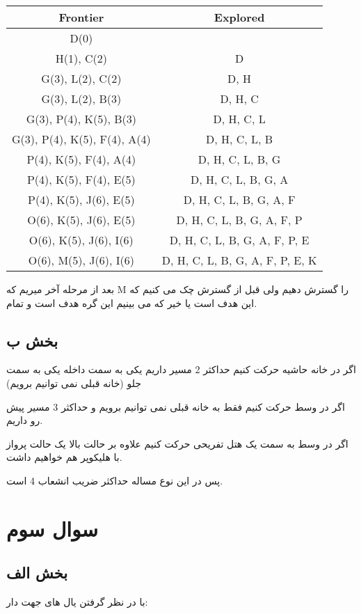 \documentclass[paper=a4, fontsize=11pt]{article}
\begin{document}
\begin{center}
\begin{latin}
\begin{tabular}{ |c|c| } 
\hline
Frontier & Explored \\
\hline
D(0) &   \\ 
H(1), C(2) & D \\ 
G(3), L(2), C(2) & D, H \\ 
G(3), L(2), B(3) & D, H, C \\ 
G(3), P(4), K(5), B(3) & D, H, C, L \\ 
G(3), P(4), K(5), F(4), A(4) & D, H, C, L, B \\ 
P(4), K(5), F(4), A(4) & D, H, C, L, B, G \\ 
P(4), K(5), F(4), E(5) & D, H, C, L, B, G, A \\ 
P(4), K(5), J(6), E(5) & D, H, C, L, B, G, A, F\\ 
O(6), K(5), J(6), E(5) & D, H, C, L, B, G, A, F, P\\ 
O(6), K(5), J(6), I(6) & D, H, C, L, B, G, A, F, P, E\\ 
O(6), M(5), J(6), I(6) & D, H, C, L, B, G, A, F, P, E, K\\ 
\hline
\end{tabular}
\end{latin}
\end{center}

بعد از مرحله آخر میریم که M را گسترش دهیم ولی قبل از گسترش چک می کنیم که این هدف است یا خیر که می بینیم این گره هدف است و تمام.


\subsection{بخش ب}
اگر در خانه حاشیه حرکت کنیم حداکثر 2 مسیر داریم یکی به سمت داخله یکی به سمت جلو (خانه قبلی نمی توانیم برویم)

اگر در وسط حرکت کنیم فقط به خانه قبلی نمی توانیم برویم و حداکثر 3 مسیر پیش رو داریم.

اگر در وسط به سمت یک هتل تفریحی حرکت کنیم علاوه بر حالت بالا یک حالت پرواز با هلیکوپر هم خواهیم داشت.

پس در این نوع مساله حداکثر ضریب انشعاب 4 است.

\section{سوال سوم}
\subsection{بخش الف}
با در نظر گرفتن یال های جهت دار:
\end{document}
